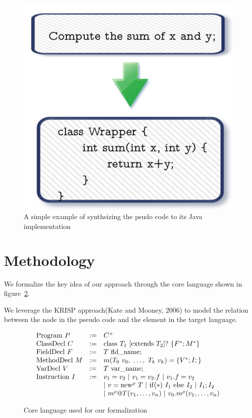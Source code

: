 \documentclass[11pt]{article}
\begin{document}
  
\begin{figure}
\centering
\includegraphics[scale=0.3]{convert.png}
\caption{A simple example of synthsizing the psudo code to its Java implementation}\label{fig:convert}
\end{figure}


\section{Methodology}
We formalize the key idea of our approach through the core language shown in
figure~\ref{fig:language}.

We leverage the KRISP approach(Kate and Mooney, 2006) to model the relation 
between the node in the pseudo code and the element in the target language.

 \begin{figure}[t]
 \small
\[
\begin{array}{lll}
{\rm Program} \ P & := & C^+ \\
{\rm ClassDecl} \ C & := & {\rm class} \ T_1 \ [{\rm extends} \ T_2]? \ \{F^*; M^*\} \\
{\rm FieldDecl}  \ F & := & T \  {\rm fld\_name}; \\
{\rm MethodDecl} \ M & := & m(T_0 \ v_0, \ \ldots, \ T_k \ v_k) = \{ V^*; I; \} \\
{\rm VarDecl} \ V & := & T \  {\rm var\_name}; \\
{\rm Instruction} \ I & := & v_1 = v_2 \ | \ v_1 = v_2.f \ | \ v_1.f = v_2 \\
& & | \ v = {\rm new}^\rho \ T  \ |  \ {\rm if}(*) \ I_1 \ {\rm else} \ I_2 \ | \ I_1; I_2 \\
& & | \ m^\rho@T(v_1, \ldots, v_n) \ | \ v_0.m^\rho(v_1, \ldots, v_n) 
\end{array}
\]
\vspace{-0.2in}
\caption{Core language used for our formalization}\label{fig:language}
\vspace{-0.1in}
\end{figure}
\end{document}
